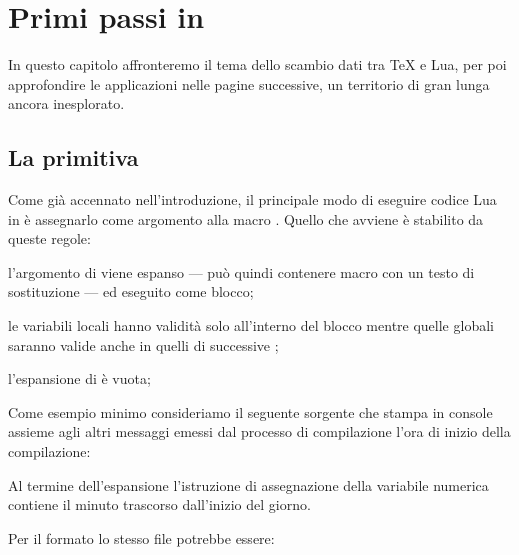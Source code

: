 
\chapter{Primi passi in \LuaTeX}

In questo capitolo affronteremo il tema dello scambio dati tra \TeX{} e Lua, per
poi approfondire le applicazioni nelle pagine successive, un territorio di gran
lunga ancora inesplorato.


\section{La primitiva }

Come già accennato nell'introduzione, il principale modo di eseguire codice Lua
in \LuaTeX{} è assegnarlo come argomento alla macro . Quello che
avviene è stabilito da queste regole:
\begin{compactenumerate}
\item
l'argomento di  viene espanso --- può quindi contenere macro con
un testo di sostituzione --- ed eseguito come blocco;

\item
le variabili locali hanno validità solo all'interno del blocco mentre quelle
globali saranno valide anche in quelli di successive ;

\item
l'espansione di  è vuota;
\end{compactenumerate}

Come esempio minimo consideriamo il seguente sorgente \LuaTeX{} che stampa in
console assieme agli altri messaggi emessi dal processo di compilazione l'ora di
inizio della compilazione:
\lines
\bye
\endlines
{}

Al termine dell'espansione l'istruzione di assegnazione della variabile numerica
 contiene il minuto trascorso dall'inizio del giorno.

Per il formato \LuaLaTeX{} lo stesso file potrebbe essere:
\lines
\documentclass{article}


\endlines
{}


\subsection{Registro delle compilazioni}

